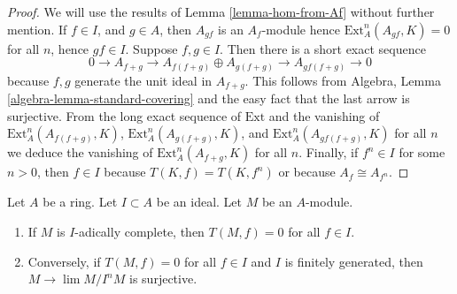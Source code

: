 \begin{proof}
We will use the results of Lemma \ref{lemma-hom-from-Af}
without further mention.
If $f \in I$, and $g \in A$, then $A_{gf}$ is an $A_f$-module
hence $\text{Ext}^n_A(A_{gf}, K) = 0$ for all $n$, hence $gf \in I$.
Suppose $f, g \in I$. Then there is a short exact sequence
$$
0 \to A_{f + g} \to A_{f(f + g)} \oplus A_{g(f + g)} \to A_{gf(f + g)} \to 0
$$
because $f, g$ generate the unit ideal in $A_{f + g}$. This follows from
Algebra, Lemma \ref{algebra-lemma-standard-covering}
and the easy fact that the last arrow is surjective.
From the long exact sequence of $\text{Ext}$ and the vanishing of
$\text{Ext}^n_A(A_{f(f + g)}, K)$,
$\text{Ext}^n_A(A_{g(f + g)}, K)$, and
$\text{Ext}^n_A(A_{gf(f + g)}, K)$ for all $n$
we deduce the vanishing of $\text{Ext}^n_A(A_{f + g}, K)$ for all $n$.
Finally, if $f^n \in I$ for some $n > 0$, then $f \in I$ because
$T(K, f) = T(K, f^n)$ or because $A_f \cong A_{f^n}$.
\end{proof}

\begin{lemma}
\label{lemma-complete-derived-complete}
Let $A$ be a ring. Let $I \subset A$ be an ideal. Let $M$ be an $A$-module.
\begin{enumerate}
\item If $M$ is $I$-adically complete, then $T(M, f) = 0$ for all $f \in I$.
\item Conversely, if $T(M, f) = 0$ for all $f \in I$ and $I$ is finitely
generated, then $M \to \lim M/I^nM$ is surjective.
\end{enumerate}
\end{lemma}

